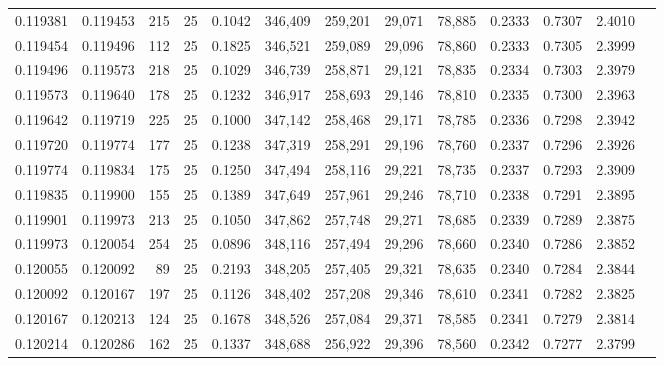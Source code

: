 \begin{tabular}{rrrrrrrrrrrrr}
0.119381 & 0.119453 &   215 &  25 &                                     0.1042 & 346,409 & 259,201 &  29,071 &  78,885 & 0.2333 & 0.7307 & 2.4010 \\
0.119454 & 0.119496 &   112 &  25 &                                     0.1825 & 346,521 & 259,089 &  29,096 &  78,860 & 0.2333 & 0.7305 & 2.3999 \\
0.119496 & 0.119573 &   218 &  25 &                                     0.1029 & 346,739 & 258,871 &  29,121 &  78,835 & 0.2334 & 0.7303 & 2.3979 \\
0.119573 & 0.119640 &   178 &  25 &                                     0.1232 & 346,917 & 258,693 &  29,146 &  78,810 & 0.2335 & 0.7300 & 2.3963 \\
0.119642 & 0.119719 &   225 &  25 &                                     0.1000 & 347,142 & 258,468 &  29,171 &  78,785 & 0.2336 & 0.7298 & 2.3942 \\
0.119720 & 0.119774 &   177 &  25 &                                     0.1238 & 347,319 & 258,291 &  29,196 &  78,760 & 0.2337 & 0.7296 & 2.3926 \\
0.119774 & 0.119834 &   175 &  25 &                                     0.1250 & 347,494 & 258,116 &  29,221 &  78,735 & 0.2337 & 0.7293 & 2.3909 \\
0.119835 & 0.119900 &   155 &  25 &                                     0.1389 & 347,649 & 257,961 &  29,246 &  78,710 & 0.2338 & 0.7291 & 2.3895 \\
0.119901 & 0.119973 &   213 &  25 &                                     0.1050 & 347,862 & 257,748 &  29,271 &  78,685 & 0.2339 & 0.7289 & 2.3875 \\
0.119973 & 0.120054 &   254 &  25 &                                     0.0896 & 348,116 & 257,494 &  29,296 &  78,660 & 0.2340 & 0.7286 & 2.3852 \\
0.120055 & 0.120092 &    89 &  25 &                                     0.2193 & 348,205 & 257,405 &  29,321 &  78,635 & 0.2340 & 0.7284 & 2.3844 \\
0.120092 & 0.120167 &   197 &  25 &                                     0.1126 & 348,402 & 257,208 &  29,346 &  78,610 & 0.2341 & 0.7282 & 2.3825 \\
0.120167 & 0.120213 &   124 &  25 &                                     0.1678 & 348,526 & 257,084 &  29,371 &  78,585 & 0.2341 & 0.7279 & 2.3814 \\
0.120214 & 0.120286 &   162 &  25 &                                     0.1337 & 348,688 & 256,922 &  29,396 &  78,560 & 0.2342 & 0.7277 & 2.3799 \\

\end{tabular}

